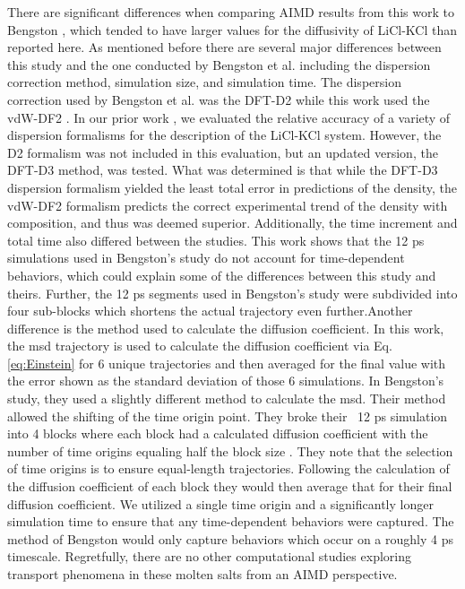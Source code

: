 \documentclass[review]{elsarticle}
\begin{document}
There are significant differences when comparing AIMD results from this work to Bengston \cite{Bengston2014}, which tended to have larger values for the diffusivity of LiCl-KCl than reported here. As mentioned before there are several major differences between this study and the one conducted by Bengston et al. \cite{Bengston2014} including the dispersion correction method, simulation size, and simulation time. The dispersion correction used by Bengston et al. was the DFT-D2\cite{grimme} while this work used the vdW-DF2 \cite{Dion2004}. In our prior work \cite{duemmler_liclkcl}, we evaluated the relative accuracy of a variety of dispersion formalisms for the description of the LiCl-KCl system. However, the D2 formalism was not included in this evaluation, but an updated version, the DFT-D3 method, was tested. What was determined is that while the DFT-D3 dispersion formalism yielded the least total error in predictions of the density, the vdW-DF2 formalism predicts the correct experimental trend of the density with composition, and thus was deemed superior. Additionally, the time increment and total time also differed between the studies. This work shows that the 12 ps simulations used in Bengston's study do not account for time-dependent behaviors, which could explain some of the differences between this study and theirs. Further, the 12 ps segments used in Bengston's study were subdivided into four sub-blocks which shortens the actual trajectory even further.Another difference is the method used to calculate the diffusion coefficient. In this work, the msd trajectory is used to calculate the diffusion coefficient via Eq. \ref{eq:Einstein} for 6 unique trajectories and then averaged for the final value with the error shown as the standard deviation of those 6 simulations. In Bengston's study, they used a slightly different method to calculate the msd. Their method allowed the shifting of the time origin point. They broke their ~12 ps simulation into 4 blocks where each block had a calculated diffusion coefficient with the number of time origins equaling half the block size \cite{Bengston2014}. They note that the selection of time origins is to ensure equal-length trajectories. Following the calculation of the diffusion coefficient of each block they would then average that for their final diffusion coefficient. We utilized a single time origin and a significantly longer simulation time to ensure that any time-dependent behaviors were captured. The method of Bengston would only capture behaviors which occur on a roughly 4 ps timescale. Regretfully, there are no other computational studies exploring transport phenomena in these molten salts from an AIMD perspective.
\end{document}
